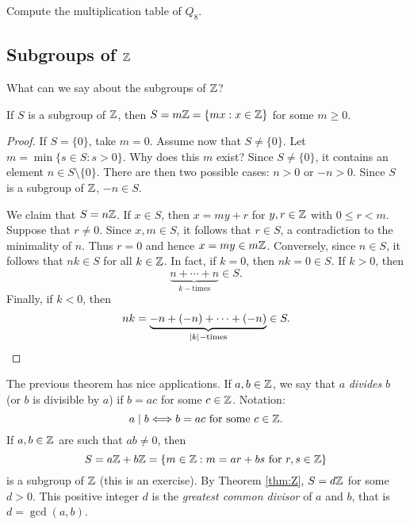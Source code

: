 \begin{exercise}
\label{xca:Q8_table}
    Compute the multiplication table of $Q_8$. 
\end{exercise}

\subsection{Subgroups of $\mathbb{Z}$}

What can we say about the subgroups of $\mathbb{Z}$? 

\begin{theorem}
        \label{thm:Z}
        If $S$ is a subgroup of $\mathbb{Z}$, then
                $S=m\mathbb{Z}=\{mx:x\in \mathbb{Z}\}$
                for some $m\geq0$.
        \end{theorem}
        
        \begin{proof}
                If $S=\{0\}$, take $m=0$. 
                Assume now that $S\ne\{0\}$. Let 
                $m=\min\{s\in S:s>0\}$. 
                Why does this $m$ exist?  
                Since $S\ne\{0\}$,  
                it contains 
                an element $n\in S\setminus\{0\}$. 
                There are then two possible cases: 
                $n>0$ or $-n>0$. Since 
                $S$ is a subgroup of $\mathbb{Z}$, $-n\in S$.
        
                We claim that $S=n\mathbb{Z}$.
                If $x\in S$, then $x=my+r$ for $y,r\in\mathbb{Z}$ with 
                $0\leq r<m$. Suppose that $r\ne 0$. Since $x,m\in S$, it follows that 
                $r\in S$,
                a contradiction to the minimality of $n$. Thus $r=0$ 
                and hence $x=my\in
                m\mathbb{Z}$. Conversely, since $n\in S$, it follows that
                 $nk\in S$ for all $k\in\mathbb{Z}$. In fact, if $k=0$, then 
                 $nk=0\in S$. If $k>0$, 
                 then 
                \[
                \underbrace{n+\cdots+n}_{k-\text{times}}\in S.
                \]
                Finally, if $k<0$, 
                then 
                \[
                nk=\underbrace{-n+(-n)+\cdots+(-n)}_{|k|-\text{times}}\in S.\qedhere
                \]
        \end{proof}

The previous theorem has nice applications. 
If $a,b\in\mathbb{Z}$, we say that $a$ \emph{divides} $b$ (or $b$ is divisible by $a$)
if $b=ac$ for some $c\in\mathbb{Z}$. Notation: 
\[
a\mid b\Longleftrightarrow b=ac\text{ for some $c\in\mathbb{Z}$.}
\]
If $a,b\in\mathbb{Z}$ are such that $ab\ne0$, then 
\[
S=a\mathbb{Z}+b\mathbb{Z}=\{m\in\mathbb{Z}:m=ar+bs\text{ for $r,s\in\mathbb{Z}$}\}
\]
is a subgroup of $\mathbb{Z}$ (this is an exercise). 
By Theorem \ref{thm:Z}, $S=d\mathbb{Z}$ for some $d>0$. 
This positive integer $d$
is the \emph{greatest common divisor} of $a$ and $b$, 
that is $d=\gcd(a,b)$. 

